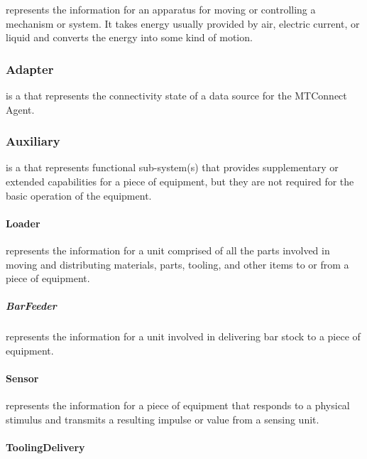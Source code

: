  represents the information for an apparatus for moving or controlling a mechanism or system. It takes energy usually provided by air, electric current, or liquid and converts the energy into some kind of motion.


\subsubsection{Adapter}
\label{sec:Adapter}



 is a  that represents the connectivity state of a data source for the \gls{MTConnect Agent}.


\subsubsection{Auxiliary}
\label{sec:Auxiliary}



 is a  that represents functional sub-system(s) that provides supplementary or extended capabilities for a piece of equipment, but they are not required for the basic operation of the equipment.


\paragraph{Loader}\mbox{}
\label{sec:Loader}


 represents the information for a unit comprised of all the parts involved in moving and distributing materials, parts, tooling, and other items to or from a piece of equipment.


\subparagraph{BarFeeder}\mbox{}
\label{sec:BarFeeder}


 represents the information for a unit involved in delivering bar stock to a piece of equipment.


\paragraph{Sensor}\mbox{}
\label{sec:Sensor}


 represents the information for a piece of equipment that responds to a physical stimulus and transmits a resulting impulse or value from a sensing unit.


\paragraph{ToolingDelivery}\mbox{}
\label{sec:ToolingDelivery}



